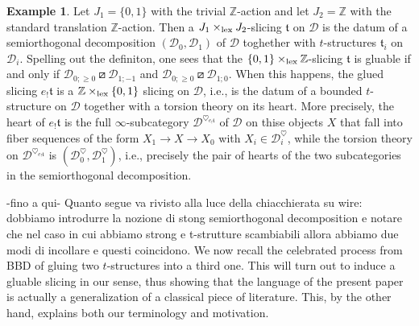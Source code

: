 \documentclass{article}
\theoremstyle{definition}
\newtheorem{exmp}[thm]{Example}
\newcommand{\Z}{\mathbb{Z}}
\newcommand{\tee}{\mathfrak{t}}
\newcommand{\orth}{\boxslash}
\newcommand{\lex}{\times_{\textnormal{lex}}}
\begin{document}
\begin{exmp} Let $J_1=\{0,1\}$ with the trivial $\Z$-action and let $J_2=\Z$ with the standard translation $\Z$-action.  Then a $J_1\lex J_2$-slicing $\tee$ on $\mathscr{D}$ is the datum of a semiorthogonal decomposition $(\mathscr{D}_0,\mathscr{D}_1)$ of $\mathscr{D}$ toghether with $t$-structures $\tee_i$ on $\mathscr{D}_i$. Spelling out the definiton, one sees that the $\{0,1\}\lex \Z$-slicing $\tee$ is gluable if and only if 
$\mathscr{D}_{0;\geq 0}\orth \mathscr{D}_{1;-1}$ and $\mathscr{D}_{0;\geq 0}\orth \mathscr{D}_{1;0}$. When this happens, the glued slicing $e_!\tee$ is a $\Z\lex\{0,1\}$ slicing on $\mathscr{D}$, i.e., is the datum of a bounded $t$-structure on $\mathscr{D}$ together with a torsion theory on its heart. More precisely, the heart of $e_!\tee$ is the full $\infty$-subcategory $\mathscr{D}^{\heartsuit_{e_!\tee}}$ of $\mathscr{D}$ on thise objects $X$ that fall into fiber sequences of the form $X_1\to X\to X_0$ with $X_i\in \mathscr{D}_i^\heartsuit$, while the torsion theory on $\mathscr{D}^{\heartsuit_{e_!\tee}}$ is
$(\mathscr{D}_0^{\heartsuit},\mathscr{D}_1^{\heartsuit})$, i.e., precisely the pair of hearts of the two subcategories in the semiorthogonal decomposition.
\end{exmp}


{\Huge -fino a qui-}
{\color{red} Quanto segue va rivisto alla luce della chiacchierata su wire: dobbiamo introdurre la nozione di stong semiorthogonal decomposition e notare che nel caso in cui abbiamo strong e t-strutture scambiabili allora abbiamo due modi di incollare e questi coincidono.}
We now recall the celebrated process from {\color{red} BBD} of gluing two $t$-structures into a third one. This will turn out to induce a gluable slicing in our sense, thus showing that the language of the present paper is actually a generalization of a classical piece of literature. This, by the other hand, explains both our terminology and motivation.
\end{document}

